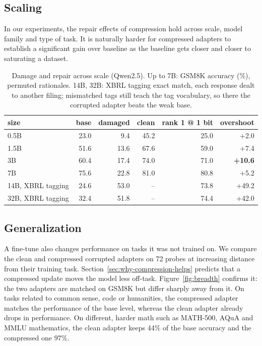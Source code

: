 \subsection{Scaling}

In our experiments, the repair effects of compression hold across scale, model family and type of task. It is naturally harder for compressed adapters to establish a significant gain over baseline as the baseline gets closer and closer to saturating a dataset. 

\begin{table}[t]
\caption{Damage and repair across scale (Qwen2.5). Up to 7B: GSM8K accuracy (\%), permuted rationales. 14B, 32B: XBRL tagging exact match, each response dealt to another filing; mismatched tags still teach the tag vocabulary, so there the corrupted adapter beats the weak base.}

\label{tab:scale}
\centering
\small
\begin{tabular}{lrrrrr}
\toprule
size & base & damaged & clean & rank 1 @ 1 bit & overshoot \\
\midrule
0.5B & 23.0 & 9.4 & 45.2 & 25.0 & +2.0 \\
1.5B & 51.6 & 13.6 & 67.6 & 59.0 & +7.4 \\
3B & 60.4 & 17.4 & 74.0 & 71.0 & \textbf{+10.6} \\
7B & 75.6 & 22.8 & 81.0 & 80.8 & +5.2 \\
\midrule
14B, XBRL tagging & 24.6 & 53.0 & -- & 73.8 & +49.2 \\
32B, XBRL tagging & 32.4 & 51.8 & -- & 74.4 & +42.0 \\
\bottomrule
\end{tabular}
\end{table}

\subsection{Generalization}
\label{sec:breadth}

A fine-tune also changes performance on tasks it was not trained on. We compare the clean and compressed corrupted adapters on 72 probes at increasing distance from their training task. Section~\ref{sec:why-compression-helps} predicts that a compressed update moves the model less off-task. Figure~\ref{fig:breadth} confirms it: the two adapters are matched on GSM8K but differ sharply away from it. On tasks related to common sense, code or humanities, the compressed adapter matches the performance of the base level, whereas the clean adapter already drops in performance. On different, harder math  such as MATH-500, AQuA and MMLU mathematics, the clean adapter keeps 44\% of the base accuracy and the compressed one 97\%.


